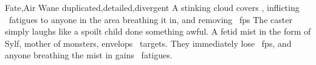   {Fate,Air}%
  {Wane}%
  {duplicated,detailed,divergent}%
  {}%
  {A stinking cloud covers \spellArea, inflicting ~\glspl{fatigue} to anyone in the area breathing it in, and removing \showDam~\glspl{fp}}%
  {
    The caster simply laughs like a spoilt child done something awful.
    A fetid mist in the form of Sylf, mother of monsters, envelops \spellArea\ targets.
    They immediately lose \showDam~\glspl{fp}, and anyone breathing the mist in gains ~\glspl{fatigue}.
  }

